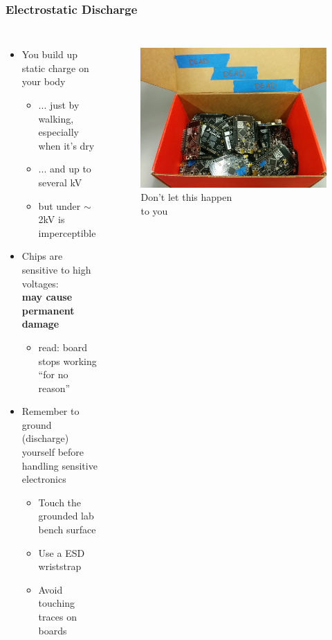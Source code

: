 \documentclass{beamer}
\begin{document}
\begin{frame}
\frametitle{Electrostatic Discharge}
\begin{columns}[t]
\begin{itemize}
  \item You build up static charge on your body
  \begin{itemize}
    \item ... just by walking, especially when it's dry
    \item ... and up to several kV
    \item but under $\sim$2kV is imperceptible
  \end{itemize}
  \item Chips are sensitive to high voltages: \\
  \textbf{may cause permanent damage}
  \begin{itemize}
    \item read: board stops working ``for no reason''
  \end{itemize}
  \item Remember to ground (discharge) yourself before handling sensitive electronics
  \begin{itemize}
    \item Touch the grounded lab bench surface
    \item Use a ESD wriststrap
    \item Avoid touching traces on boards
  \end{itemize}
\end{itemize}

\begin{figure}
\centering
\includegraphics[width=0.8\columnwidth]{images-dis1/fried-boards}
\newline
Don't let this happen \\
to you
\end{figure}
\end{columns}
\end{frame}
\end{document}
